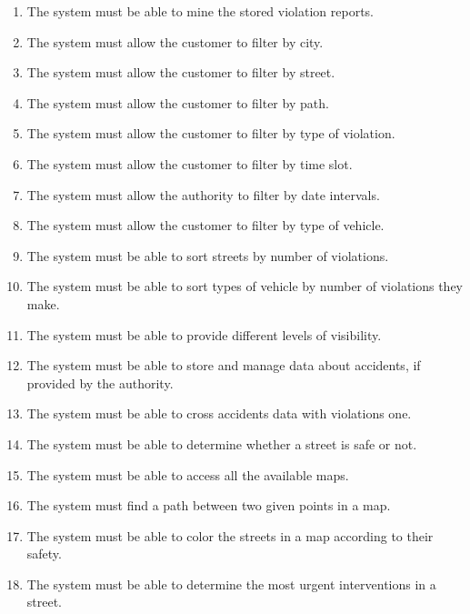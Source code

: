 \begin{enumerate}[label=\textbf{R\arabic*}]
			\item \label{req:mineData} The system must be able to mine the stored violation reports.
			\item \label{req:cityFilter} The system must allow the customer to filter by city.
			\item \label{req:streetFilter} The system must allow the customer to filter by street.
			\item \label{req:pathFilter} The system must allow the customer to filter by path.
			\item \label{req:violationFilter} The system must allow the customer to filter by type of violation.
			\item \label{req:timeFilter} The system must allow the customer to filter by time slot.
			\item \label{req:dateFilter} The system must allow the authority to filter by date intervals.
			\item \label{req:vehicleFilter} The system must allow the customer to filter by type of vehicle.
			\item \label{req:sortedResult} The system must be able to sort streets by number of violations.
			\item \label{req:sortedVehicles} The system must be able to sort types of vehicle by number of violations they make.
			\item \label{req:visibility} The system must be able to provide different levels of visibility.
			\item \label{req:accidentsData} The system must be able to store and manage data about accidents, if provided by the authority.
			\item \label{req:crossData} The system must be able to cross accidents data with violations one.
			\item \label{req:safeStreet} The system must be able to determine whether a street is safe or not.
			\item \label{req:cityStreets} The system must be able to access all the available maps.
			\item \label{req:pathFinder} The system must find a path between two given points in a map.
			\item \label{req:colorMap} The system must be able to color the streets in a map according to their safety.
			\item \label{req:interventions} The system must be able to determine the most urgent interventions in a street.	
		\end{enumerate}
	
